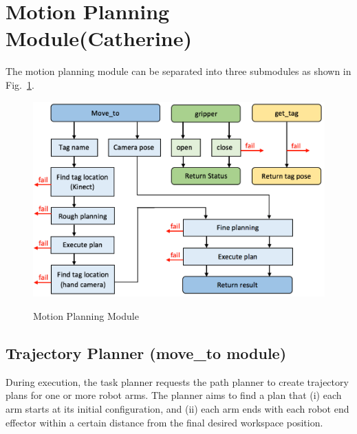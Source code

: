 \section{Motion Planning Module(Catherine)}



The motion planning module can be separated into three submodules as shown in Fig.~\ref{fig:plan}.

\begin{figure}[ht!]%
\centering
{\includegraphics[width=0.95\columnwidth]{pics/motion_planning_flow.png}}
\caption{Motion Planning Module}
\label{fig:plan}
\end{figure}


\subsection{Trajectory Planner (move\_to module)}

During execution, the task planner requests the path planner to create trajectory plans for one or more robot arms. The planner aims to find a plan that (i) each arm starts at its initial configuration, and (ii) each arm ends with each robot end effector within a certain distance from the final desired workspace position. 

